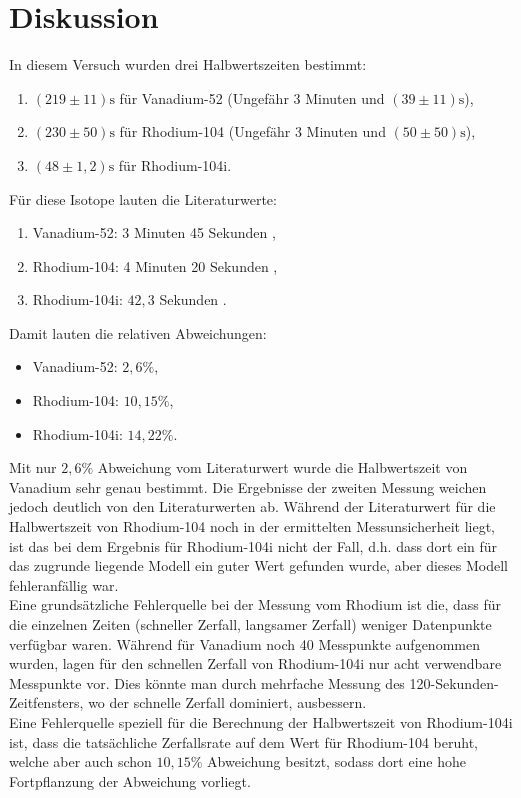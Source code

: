 \section{Diskussion}
\label{sec:Diskussion}

In diesem Versuch wurden drei Halbwertszeiten bestimmt:
\begin{enumerate}
	\item $(219 \pm 11) \si{\second}$ für Vanadium-52 (Ungefähr 3 Minuten und $(39 \pm 11)\si{\second}$),
	\item $(230 \pm 50) \si{\second}$ für Rhodium-104 (Ungefähr 3 Minuten und $(50 \pm 50)\si{\second}$),
	\item $(48 \pm 1,2) \si{\second}$ für Rhodium-104i.
\end{enumerate}
\noindent
Für diese Isotope lauten die Literaturwerte:
\begin{enumerate}
	\item Vanadium-52: 3 Minuten 45 Sekunden \cite{chemie-vanadium},
	\item Rhodium-104: 4 Minuten 20 Sekunden \cite{internetchemie-rhodium},
	\item Rhodium-104i: $42,3$ Sekunden \cite{internetchemie-rhodium}.
\end{enumerate}
Damit lauten die relativen Abweichungen:
\begin{itemize}
	\item Vanadium-52: $2,6\%$,
	\item Rhodium-104: $10,15\%$,
	\item Rhodium-104i: $14,22\%$.
\end{itemize}

\noindent
Mit nur $2,6\%$ Abweichung vom Literaturwert wurde die Halbwertszeit von Vanadium sehr genau bestimmt. Die 
Ergebnisse der zweiten Messung weichen jedoch deutlich von den Literaturwerten ab. 
Während der Literaturwert für die Halbwertszeit
von Rhodium-104 noch in der ermittelten Messunsicherheit liegt, ist das bei dem Ergebnis für Rhodium-104i nicht
der Fall, d.h. dass dort ein für das zugrunde liegende Modell ein guter Wert gefunden wurde, aber dieses Modell
fehleranfällig war.
\\
Eine grundsätzliche Fehlerquelle bei der Messung vom Rhodium ist die, dass für die einzelnen Zeiten (schneller
Zerfall, langsamer Zerfall) weniger Datenpunkte verfügbar waren. Während für Vanadium noch 40 Messpunkte
aufgenommen wurden, lagen für den schnellen Zerfall von Rhodium-104i nur acht verwendbare Messpunkte vor.
Dies könnte man durch mehrfache Messung des 120-Sekunden-Zeitfensters, wo der schnelle Zerfall dominiert, 
ausbessern.
\\
Eine Fehlerquelle speziell für die Berechnung der Halbwertszeit von Rhodium-104i ist, 
dass die tatsächliche Zerfallsrate
auf dem Wert für Rhodium-104 beruht, welche aber auch schon $10,15\%$ Abweichung besitzt, sodass dort 
eine hohe Fortpflanzung der Abweichung vorliegt.
